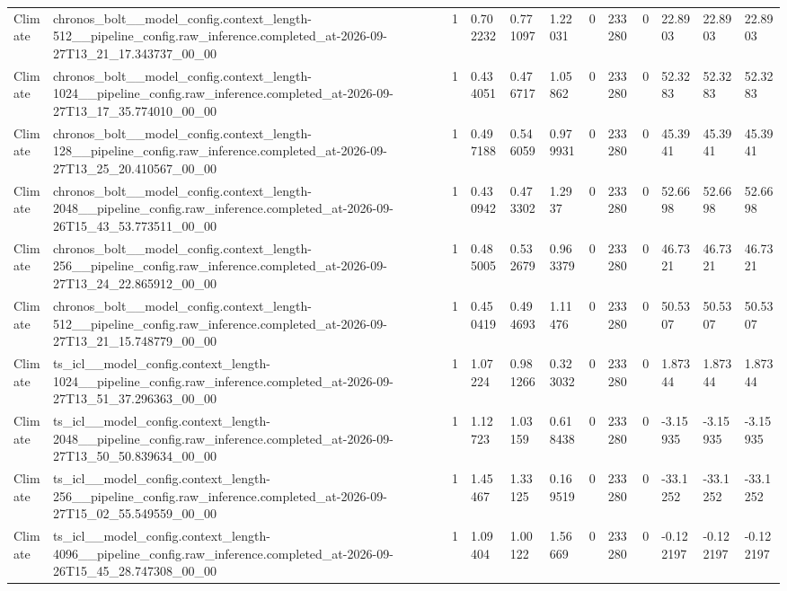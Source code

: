 \begin{tabular}{llllllllllll}
Climate & chronos\_bolt\_\_model\_config.context\_length-512\_\_pipeline\_config.raw\_inference.completed\_at-2026-09-27T13\_21\_17.343737\_00\_00 & 1 & 0.702232 & 0.771097 & 1.22031 & 0 & 233280 & 0 & 22.8903 & 22.8903 & 22.8903 \\
Climate & chronos\_bolt\_\_model\_config.context\_length-1024\_\_pipeline\_config.raw\_inference.completed\_at-2026-09-27T13\_17\_35.774010\_00\_00 & 1 & 0.434051 & 0.476717 & 1.05862 & 0 & 233280 & 0 & 52.3283 & 52.3283 & 52.3283 \\
Climate & chronos\_bolt\_\_model\_config.context\_length-128\_\_pipeline\_config.raw\_inference.completed\_at-2026-09-27T13\_25\_20.410567\_00\_00 & 1 & 0.497188 & 0.546059 & 0.979931 & 0 & 233280 & 0 & 45.3941 & 45.3941 & 45.3941 \\
Climate & chronos\_bolt\_\_model\_config.context\_length-2048\_\_pipeline\_config.raw\_inference.completed\_at-2026-09-26T15\_43\_53.773511\_00\_00 & 1 & 0.430942 & 0.473302 & 1.2937 & 0 & 233280 & 0 & 52.6698 & 52.6698 & 52.6698 \\
Climate & chronos\_bolt\_\_model\_config.context\_length-256\_\_pipeline\_config.raw\_inference.completed\_at-2026-09-27T13\_24\_22.865912\_00\_00 & 1 & 0.485005 & 0.532679 & 0.963379 & 0 & 233280 & 0 & 46.7321 & 46.7321 & 46.7321 \\
Climate & chronos\_bolt\_\_model\_config.context\_length-512\_\_pipeline\_config.raw\_inference.completed\_at-2026-09-27T13\_21\_15.748779\_00\_00 & 1 & 0.450419 & 0.494693 & 1.11476 & 0 & 233280 & 0 & 50.5307 & 50.5307 & 50.5307 \\
Climate & ts\_icl\_\_model\_config.context\_length-1024\_\_pipeline\_config.raw\_inference.completed\_at-2026-09-27T13\_51\_37.296363\_00\_00 & 1 & 1.07224 & 0.981266 & 0.323032 & 0 & 233280 & 0 & 1.87344 & 1.87344 & 1.87344 \\
Climate & ts\_icl\_\_model\_config.context\_length-2048\_\_pipeline\_config.raw\_inference.completed\_at-2026-09-27T13\_50\_50.839634\_00\_00 & 1 & 1.12723 & 1.03159 & 0.618438 & 0 & 233280 & 0 & -3.15935 & -3.15935 & -3.15935 \\
Climate & ts\_icl\_\_model\_config.context\_length-256\_\_pipeline\_config.raw\_inference.completed\_at-2026-09-27T15\_02\_55.549559\_00\_00 & 1 & 1.45467 & 1.33125 & 0.169519 & 0 & 233280 & 0 & -33.1252 & -33.1252 & -33.1252 \\
Climate & ts\_icl\_\_model\_config.context\_length-4096\_\_pipeline\_config.raw\_inference.completed\_at-2026-09-26T15\_45\_28.747308\_00\_00 & 1 & 1.09404 & 1.00122 & 1.56669 & 0 & 233280 & 0 & -0.122197 & -0.122197 & -0.122197 \\

\end{tabular}
